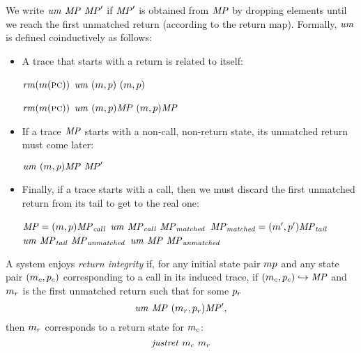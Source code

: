 \documentclass[acmsmall,review,anonymous]{acmart}\settopmatter{printfolios=true,printccs=false,printacmref=false}
\begin{document}
We write $\mathit{um}~\mathit{MP}~\mathit{MP}'$ if $\mathit{MP}'$ is
obtained from $\mathit{MP}$ by dropping elements until we reach the first unmatched return
(according to the return map).  Formally, $\mathit{um}$ is defined coinductively as follows:
\begin{itemize}
\item A trace that starts with a return is related to itself:

\begin{minipage}{.3\textwidth}
  \judgmenttwo{\(\callmap(\mach(\PCname)) = \bot\)}
              {\(\mathit{rm}(m(\textsc{pc}))\)}
              {\(\mathit{um} ~ (m,p) ~ (m,p)\)}
\end{minipage}
\hspace*{0.1\textwidth}
\begin{minipage}{.3\textwidth}
  \judgmenttwo{\(\callmap(\mach(\PCname)) = \bot\)}
              {\(\mathit{rm}(m(\textsc{pc}))\)}
              {\(\mathit{um} ~ (m,p)\mathit{MP} ~ (m,p)\mathit{MP}\)}
\end{minipage}

\item If a trace \(\mathit{MP}\) starts with a non-call, non-return state,
  its unmatched return must come later:

           {\(\mathit{um} ~ (m,p)\mathit{MP} ~ \mathit{MP}'\)}

\item Finally, if a trace starts with a call, then we must discard the first
  unmatched return from its tail to get to the real one:


             {\(\mathit{MP} = (m,p)\mathit{MP}_{\mathit{call}}\) \quad \(\mathit{um} ~ \mathit{MP}_{\mathit{call}} ~ \mathit{MP}_{\mathit{matched}}\)}
             {\(\mathit{MP}_{\mathit{matched}} = (m',p') \mathit{MP}_{\mathit{tail}}\) \quad
              \(\mathit{um} ~ \mathit{MP}_{\mathit{tail}} ~ \mathit{MP}_{\mathit{unmatched}}\)}
            {\(\mathit{um} ~ \mathit{MP} ~ \mathit{MP}_{\mathit{unmatched}}\)}
\end{itemize}

A system enjoys {\em return integrity}
if, for any initial state pair
$mp$ and any state pair \((m_c, p_c)\)
corresponding to a call in its induced trace, if
\((m_c,p_c) \hookrightarrow \mathit{MP}\) and \(m_r\)
is the first unmatched return such that for some $p_r$
\[ \mathit{um} ~ \mathit{MP} ~ (m_r,p_r)\mathit{MP}',\]
then $m_r$ corresponds to a return state for $m_c$:
\[\mathit{justret}\ m_c\ m_r\]
\end{document}
